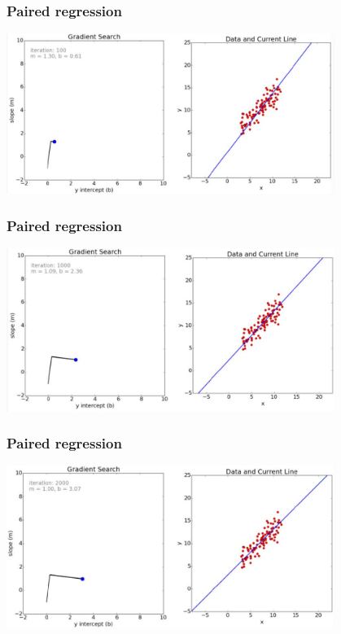 \documentclass[default]{beamer}
\begin{document}
	\begin{frame}	
\frametitle{Paired regression}

\centering
\includegraphics[width=0.8\textwidth]{linear_25.jpg}
\end{frame}

	\begin{frame}	
\frametitle{Paired regression}

\centering
\includegraphics[width=0.8\textwidth]{linear_26.jpg}
\end{frame}

	\begin{frame}	
\frametitle{Paired regression}

\centering
\includegraphics[width=0.8\textwidth]{linear_27.jpg}
\end{frame}
\end{document}
